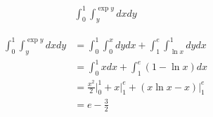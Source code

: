 \begin{align*}
    \int_{0}^{1} \int_{y}^{\exp{y}} dx dy
\end{align*}

\begin{solution}
    \begin{align*}
        \int_{0}^{1} \int_{y}^{\exp{y}} dx dy &= \int_{0}^{1} \int_{0}^{x} dy dx + \int_{1}^{e} \int_{\ln{x}}^{1} dy dx \\
        &= \int_{0}^{1} xdx + \int_{1}^{e} \left(1 - \ln{x}\right)dx \\
        &= \frac{x^2}{2}\bigg|_{0}^{1} + x\bigg|_{1}^{e} + \left(x\ln{x} - x\right)\bigg|_{1}^{e} \\
        &= e - \frac{3}{2}
    \end{align*}
\end{solution}